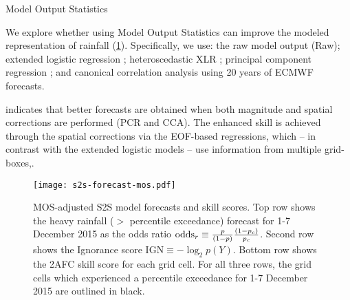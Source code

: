   \begin{block}{Model Output Statistics}

  We explore whether using Model Output Statistics \cite[MOS;][]{Glahn:1972vt} can improve the modeled representation of rainfall (\cref{fig:subs-prob-fcst}).
  Specifically, we use: the raw model output (Raw); extended logistic regression \cite[XLR;][]{Wilks:2009bk}; heteroscedastic XLR \cite[HXLR;][]{Messner:2014gp}; principal component regression \cite[PCR;][]{Mason:2008da,Wilks:2006fx}; and canonical correlation analysis \cite[CCA;][]{Mason:2008da,Barnston:1992gd} using 20 years of ECMWF forecasts.

  \vspace{0.5cm}

   indicates that better forecasts are obtained when both magnitude and spatial corrections are performed (PCR and CCA).
  The enhanced skill is achieved through the spatial corrections via the EOF-based regressions, which -- in contrast with the extended logistic models -- use information from multiple grid-boxes,.

  \begin{mdframed}
  \begin{figure}
  	\noindent\texttt{[image: s2s-forecast-mos.pdf]}
  	\caption{
    MOS-adjusted S2S model forecasts and skill scores.
    Top row shows the heavy rainfall ($>$ percentile exceedance) forecast for 1-7 December 2015 as the odds ratio $\text{odds}_{r} \equiv \frac{p}{\qty(1 - p)} \frac{\qty(1 - p_c)}{p_c}$.
    Second row shows the Ignorance score $\text{IGN} \equiv - \log_2 p(Y)$.
    Bottom row shows the 2AFC skill score for each grid cell.
    For all three rows, the grid cells which experienced a  percentile exceedance for 1-7 December 2015 are outlined in black.
        \label{fig:subs-prob-fcst}
  	}
  \end{figure}
  \end{mdframed}
\end{block}
